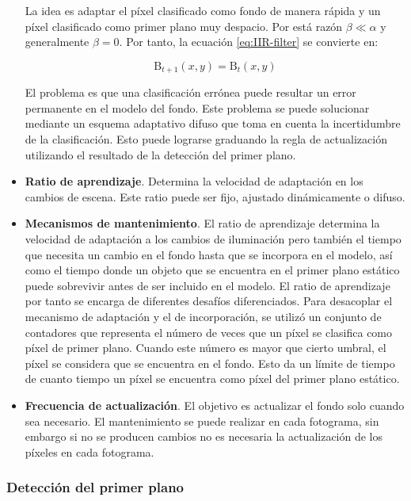 \begin{itemize}
    La idea es adaptar el píxel clasificado como fondo de manera rápida y un píxel clasificado como primer plano muy despacio. Por está razón $\beta \ll \alpha$ y generalmente $\beta = 0$. Por tanto, la ecuación \ref{eq:IIR-filter} se convierte en:
    
    \begin{equation}
    \label{eq:IIR-filter2}
    \text{B}_{t+1}(x,y) = \text{B}_{t}(x,y)
    \end{equation}
    
    El problema es que una clasificación errónea puede resultar un error permanente en el modelo del fondo. Este problema se puede solucionar mediante un esquema adaptativo difuso que toma en cuenta la incertidumbre de la clasificación. Esto puede lograrse graduando la regla de actualización utilizando el resultado de la detección del primer plano.
    
    \item \textbf{Ratio de aprendizaje}. Determina la velocidad de adaptación en los cambios de escena. Este ratio puede ser fijo, ajustado dinámicamente o difuso.
    \item \textbf{Mecanismos de mantenimiento}. El ratio de aprendizaje determina la velocidad de adaptación a los cambios de iluminación pero también el tiempo que necesita un cambio en el fondo hasta que se incorpora en el modelo, así como el tiempo donde un objeto que se encuentra en el primer plano estático puede sobrevivir antes de ser incluido en el modelo. El ratio de aprendizaje por tanto se encarga de diferentes desafíos diferenciados. Para desacoplar el mecanismo de adaptación y el de incorporación, \cite{1415580} se utilizó un conjunto de contadores que representa el número de veces que un píxel se clasifica como píxel de primer plano. Cuando este número es mayor que cierto umbral, el píxel se considera que se encuentra en el fondo. Esto da un límite de tiempo de cuanto tiempo un píxel se encuentra como píxel del primer plano estático.
    \item \textbf{Frecuencia de actualización}. El objetivo es actualizar el fondo solo cuando sea necesario. El mantenimiento se puede realizar en cada fotograma, sin embargo si no se producen cambios no es necesaria la actualización de los píxeles en cada fotograma.
\end{itemize}

\subsubsection*{Detección del primer plano}
\label{subsubsec:detección-primer-plano}

